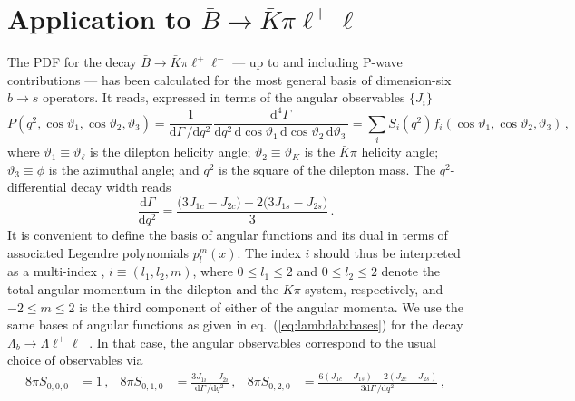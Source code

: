 \documentclass[aps,prd,reprint,nofootinbib,preprintnumbers]{revtex4}
\newcommand{\refeq}[1]{eq.~(\ref{eq:#1})}
\newcommand{\rmdx}[1]{\mbox{d} #1 \,} %
\renewcommand{\theta}{\vartheta}
\begin{document}
\section{Application to $\bar{B}\to\bar{K}\pi\ell^+\ell^-$}
\label{app:btokstarll}

The PDF for the decay $\bar{B}\to\bar{K}\pi\ell^+\ell^-$ --- up to and including P-wave contributions --- has been calculated
for the most general basis of dimension-six $b\to s$ operators. It reads, expressed in terms of the angular observables $\lbrace J_i\rbrace$ \cite{Blake:2012mb,Bobeth:2012vn}
\begin{equation}
    P(q^2, \cos\theta_1, \cos\theta_2, \theta_3) = \frac{1}{\rmdx{\Gamma}/\rmdx{q^2}} \frac{\rmdx{^4\Gamma}}{\rmdx{q^2} \rmdx{\cos\theta_1} \rmdx{\cos\theta_2} \rmdx{\theta_3}}
    = \sum_i S_i(q^2) f_i(\cos\theta_1, \cos\theta_2, \theta_3)\,,
\end{equation}
where $\theta_1 \equiv \theta_\ell$ is the dilepton helicity angle; $\theta_2 \equiv \theta_{K}$ is the $\bar{K}\pi$ helicity angle; $\theta_3 \equiv \phi$ is the azimuthal angle;
and $q^2$ is the square of the dilepton mass. The $q^2$-differential decay width reads
\begin{equation}
    \frac{\rmdx{\Gamma}}{\rmdx{q^2}} = \frac{\big(3 J_{1c} - J_{2c}\big) + 2\big(3J_{1s} - J_{2s}\big)}{3}\,.
\end{equation}
It is convenient to define the basis of angular functions and its dual in terms of
associated Legendre polynomials $p_l^m(x)$. The index $i$ should thus be interpreted as a multi-index
, $i \equiv (l_1, l_2, m)$, where $0 \leq l_1 \leq 2$ and $0 \leq l_2 \leq 2$ denote the total angular
momentum in the dilepton and the $K\pi$ system, respectively, and $-2 \leq m \leq 2$
is the third component of either of the angular momenta.
We use the same bases of angular functions as given in \refeq{lambdab:bases} for the decay $\Lambda_b\to \Lambda\ell^+\ell^-$.
In that case, the angular observables correspond to the usual choice of observables via
\begin{equation}
\begin{aligned}
    8\pi S_{0, 0,  0} & = 1\,,                                                                             &
    8\pi S_{0, 1,  0} & = \frac{3 J_{1i} - J_{2i}}{\rmdx{\Gamma}/\rmdx{q^2}}\,,                            &
    8\pi S_{0, 2,  0} & = \frac{6 (J_{1c} - J_{1s}) - 2(J_{2c} - J_{2s})}{3\rmdx{\Gamma}/\rmdx{q^2}}\,,
\end{aligned}
\end{equation}
\end{document}
